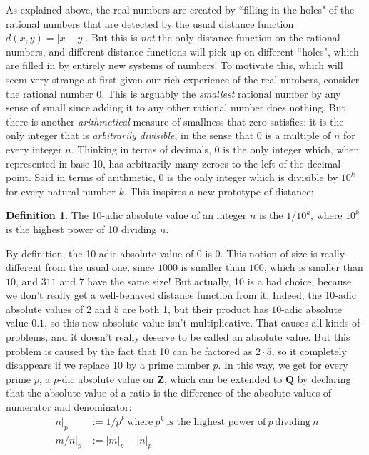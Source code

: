 \documentclass[11pt]{amsart}
\newcommand*{\Z}{\ensuremath{\mathbf{Z}}}
\newcommand*{\Q}{\ensuremath{\mathbf{Q}}}
\theoremstyle{plain}
\theoremstyle{definition}
\newtheorem{definition}[theorem]{Definition}
\theoremstyle{remark}
\numberwithin{theorem}{section}
\numberwithin{equation}{section}
\begin{document}
As explained above, the real numbers are created by ``filling in the holes" of the rational numbers that are detected by the
usual distance function $d(x,y)=|x-y|$.  But this is {\em not} the only distance function on the rational numbers, and
different distance functions will pick up on different ``holes", which are filled in by entirely new systems of numbers!
To motivate this, which will seem very strange at first given our rich experience of the real numbers, consider the rational
number 0.  This is arguably the {\em smallest} rational number by any sense of small since adding it to any other rational number
does nothing.  But there is another {\em arithmetical} measure of smallness that zero satisfies: it is the only integer
that is {\em arbitrarily divisible}, in the sense that $0$ is a multiple of $n$ for every integer $n$.  Thinking in terms of 
decimals, $0$ is the only integer which, when represented in base 10, has arbitrarily many zeroes to the left of the decimal point.
Said in terms of arithmetic, 0 is the only integer which is divisible by $10^k$ for every natural number $k$.
This inspires a new prototype of distance:

\begin{definition}
	The 10-adic absolute value of an integer $n$ is the $1/10^k$, where $10^k$ is the highest power of
	10 dividing $n$.
\end{definition}  

By definition, the 10-adic absolute value of $0$ is 0.  This notion of size 
is really different from the usual one, since $1000$ is smaller than $100$, which is smaller than $10$,
and $311$ and $7$ have the same size!  But actually, 10 is a bad choice, because we don't really get a well-behaved
distance function from it.  Indeed, the 10-adic absolute values of $2$ and $5$ are both 1, but their product has 
$10$-adic absolute value $0.1$, so this new absolute value isn't multiplicative.  That causes all kinds of problems,
and it doesn't really deserve to be called an absolute value.  But this problem is caused by the fact that 10 can be factored as $2\cdot 5$,
so it completely disappears if we replace 10 by a prime number $p$.  In this way, we get for every prime $p$,
a $p$-dic absolute value on $\Z$, which can be extended to $\Q$ by declaring that the absolute value of
a ratio is the difference of the absolute values of numerator and denominator:
\begin{align*}
	|n|_p &:= 1/p^k\ \text{where}\ p^k\ \text{is the highest power of}\ p\ \text{dividing}\ n \\
	|m/n|_p &:= |m|_p - |n|_p
\end{align*}
\end{document}
